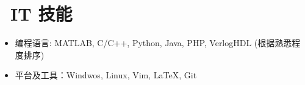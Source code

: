 \documentclass{resume}
\begin{document}
%
%


\section{\faCogs\ IT 技能}
\begin{itemize}[parsep=0.5ex]
  \item 编程语言: MATLAB, C/C++, Python, Java, PHP, VerlogHDL (根据熟悉程度排序)
  \item 平台及工具：Windwos, Linux, Vim, \LaTeX, Git
\end{itemize}
\end{document}
